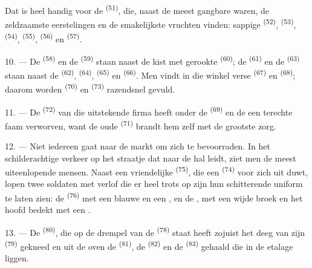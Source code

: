 Dat is heel handig voor de  \textsuperscript{(51)}, die, naast de meest
gangbare waren, de zeldzaamste eerstelingen en de smakelijkste vruchten vinden: sappige
 \textsuperscript{(52)},  \textsuperscript{(53)},
 \textsuperscript{(54)},
 \textsuperscript{(55)}, 
\textsuperscript{(56)} en  \textsuperscript{(57)}.

\VUsaut{4.0mm}
\VUsaut{3.0mm}

10. --- De  \textsuperscript{(58)} en de  \textsuperscript{(59)}
staan naast de kist met gerookte  \textsuperscript{(60)}; de
 \textsuperscript{(61)} en de
 \textsuperscript{(63)} staan naast de 
\textsuperscript{(62)},  \textsuperscript{(64)},
 \textsuperscript{(65)} en 
\textsuperscript{(66)}. Men vindt in die winkel verse  \textsuperscript{(67)}
en  \textsuperscript{(68)}; daarom worden
 \textsuperscript{(70)} en 
\textsuperscript{(73)} razendsnel gevuld.

11. --- De  \textsuperscript{(72)} van die uitstekende firma heeft onder de
 \textsuperscript{(69)} en de  een terechte faam
verworven, want de oude  \textsuperscript{(71)} brandt hem zelf met de
grootste zorg.

\VUsaut{4.0mm}
\VUsaut{3.0mm}

12. --- Niet iedereen gaat naar de markt om zich te bevoorraden. In het schilderachtige
verkeer op het straatje dat naar de hal leidt, ziet men de meest uiteenlopende mensen. Naast
een vriendelijke  \textsuperscript{(75)}, die een 
\textsuperscript{(74)} voor zich uit duwt, lopen twee soldaten met verlof die er heel trots op
zijn hun schitterende uniform te laten zien: de  \textsuperscript{(76)} met een
blauwe  en een , en de
, met een wijde broek en het hoofd bedekt met een
.

13. --- De  \textsuperscript{(80)}, die op de drempel van de
 \textsuperscript{(78)} staat heeft zojuist het deeg van zijn
 \textsuperscript{(79)} gekneed en uit de oven de
 \textsuperscript{(81)}, de 
\textsuperscript{(82)} en de  \textsuperscript{(83)} gehaald die in de
etalage liggen.

